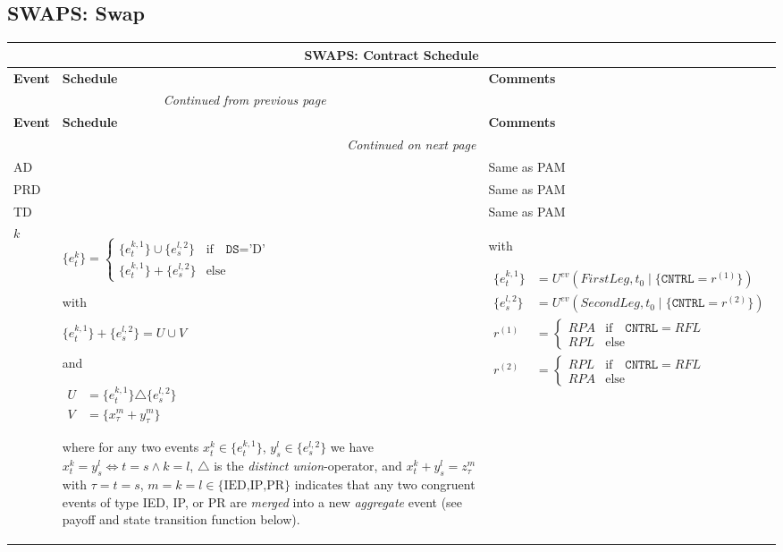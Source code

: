 \documentclass[9pt,oneside]{amsart}
\newenvironment{schedule}[1]{
	\hfill %
	\begin{longtable}{| p{0.05\textwidth} | p{0.5\textwidth} |  p{0.4\textwidth} |}
	\multicolumn{3}{c}{\textbf{#1: Contract Schedule}}\\
	\hline
	\textbf{Event} & \textbf{Schedule} & \textbf{Comments} \\
	\hline
	\endfirsthead
	\multicolumn{2}{c}{\textit{Continued from previous page}} \\
	\hline
	\textbf{Event} & \textbf{Schedule} & \textbf{Comments} \\
	\hline
	\endhead
	\hline \multicolumn{2}{r}{\textit{Continued on next page}} \\
	\endfoot
	\endlastfoot
}{%
	\hline
	\end{longtable}
}
\newcommand{\attr}[1]{\texttt{#1}}
\newcommand{\cldev}[3]{U^{ev}(#1,#2 \mid\{#3\})}
\begin{document}

\subsection{SWAPS: Swap}\label{sec:swaps}


\begin{schedule}{SWAPS}
	AD & & Same as PAM \\
	\hline
	PRD & & Same as PAM \\
	\hline
	TD & & Same as PAM \\
	\hline
	$k$ & $\{e_t^k\} = \begin{cases}
				\{e_t^{k,1}\}\cup \{e_s^{l,2}\} & \text{if}\quad \attr{DS}=\text{'D'} \\
				\{e_t^{k,1}\} + \{e_s^{l,2}\} & \text{else} \end{cases}$ \par
	with\par
	$\{e_t^{k,1}\}+\{e_s^{l,2}\} = U \cup V$\par
	and\par
	{$\begin{aligned}
		U &= \{e_t^{k,1}\} \triangle \{e_s^{l,2}\}\\
		V &= \{x_\tau^m+y_\tau^m\}
	\end{aligned}$} \par
	where for any two events $x_t^k\in\{e_t^{k,1}\}$, $y_s^l\in\{e_s^{l,2}\}$ we have $x_t^k=y_s^l \iff t=s \land k=l$, $\triangle$ is the \textit{distinct union}-operator, and $x_t^k+y_s^l=z_\tau^m$ with $\tau=t=s$, $m=k=l\in\{\text{IED,IP,PR}\}$ indicates that any two congruent events of type IED, IP, or PR are \textit{merged} into a new \textit{aggregate} event (see payoff and state transition function below).
		& with\par
			{$\begin{aligned}
				\{e_t^{k,1}\} &= \cldev{FirstLeg}{t_0}{\attr{CNTRL}=r^{(1)}} \\
				\{e_s^{l,2}\} &= \cldev{SecondLeg}{t_0}{\attr{CNTRL}=r^{(2)}} \\
				r^{(1)} &= \begin{cases} RPA & \text{if}\quad \attr{CNTRL}=RFL \\
					RPL & \text{else} \end{cases} \\
				r^{(2)} &= \begin{cases} RPL & \text{if}\quad \attr{CNTRL}=RFL \\
					RPA & \text{else} \end{cases}
			\end{aligned}$} \\
\end{schedule}
\end{document}
